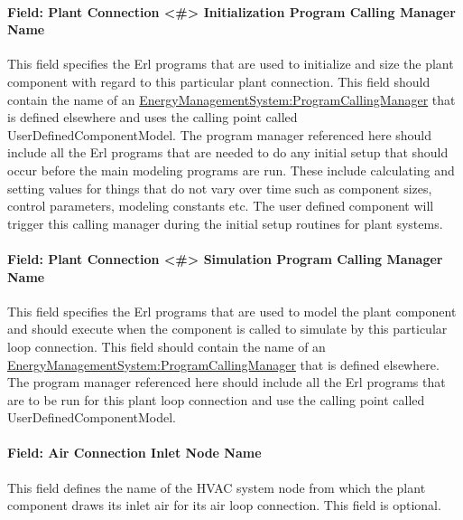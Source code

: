\paragraph{Field: Plant Connection \textless{}\#\textgreater{} Initialization Program Calling Manager Name}\label{field-plant-connection-x-initialization-program-calling-manager-name}

This field specifies the Erl programs that are used to initialize and size the plant component with regard to this particular plant connection. This field should contain the name of an \hyperref[energymanagementsystemprogramcallingmanager]{EnergyManagementSystem:ProgramCallingManager} that is defined elsewhere and uses the calling point called UserDefinedComponentModel. The program manager referenced here should include all the Erl programs that are needed to do any initial setup that should occur before the main modeling programs are run. These include calculating and setting values for things that do not vary over time such as component sizes, control parameters, modeling constants etc. The user defined component will trigger this calling manager during the initial setup routines for plant systems.

\paragraph{Field: Plant Connection \textless{}\#\textgreater{} Simulation Program Calling Manager Name}\label{field-plant-connection-x-simulation-program-calling-manager-name}

This field specifies the Erl programs that are used to model the plant component and should execute when the component is called to simulate by this particular loop connection. This field should contain the name of an \hyperref[energymanagementsystemprogramcallingmanager]{EnergyManagementSystem:ProgramCallingManager} that is defined elsewhere. The program manager referenced here should include all the Erl programs that are to be run for this plant loop connection and use the calling point called UserDefinedComponentModel.

\paragraph{Field: Air Connection Inlet Node Name}\label{field-air-connection-inlet-node-name}

This field defines the name of the HVAC system node from which the plant component draws its inlet air for its air loop connection. This field is optional.

